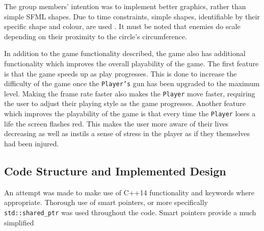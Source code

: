 \documentclass[10pt,twocolumn]{witseiepaper}
\begin{document}
The group members' intention was to implement better graphics, rather than simple SFML shapes. Due to time constraints, simple shapes, identifiable by their specific shape and colour, are used . It must be noted that enemies do scale depending on their proximity to the circle's circumference.

In addition to the game functionality described, the game also has additional functionality which improves the overall playability of the game. The first feature is that the game speeds up as play progresses. This is done to increase the difficulty of the game once the \texttt{Player's} gun has been upgraded to the maximum level. Making the frame rate faster also makes the \texttt{Player} move faster, requiring the user to adjust their playing style as the game progresses. Another feature which improves the playability of the game is that every time the \texttt{Player} loses a life the screen flashes red. This makes the user more aware of their lives decreasing as well as instils a sense of stress in the player as if they themselves had been injured. 

\subsection{Code Structure and Implemented Design}\label{critical_code_structure}

An attempt was made to make use of C++14 functionality and keywords where appropriate. Thorough use of smart pointers, or more specifically \texttt{std::shared\_ptr} was used throughout the code. Smart pointers provide a much simplified 




\end{document}
